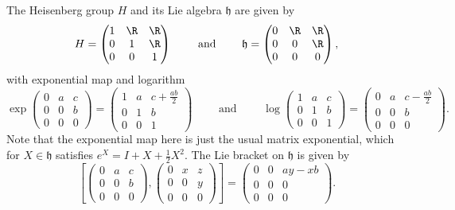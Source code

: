 \begin{example}
\label{ex:heisenberg_def}
The Heisenberg group $H$ and its Lie algebra $\mathfrak{h}$ are given by
\[
H=\left(\begin{matrix} 1 & \R & \R \\ 0 & 1 & \R \\ 0&0&1\end{matrix}\right) \qquad \text{ and } \qquad
\mathfrak{h}=\left(\begin{matrix} 0 & \R & \R \\ 0 & 0 & \R \\ 0&0&0\end{matrix}\right),
\]
with exponential map and logarithm
\[
\exp \left(\begin{matrix} 0 & a & c \\ 0 & 0 & b \\ 0&0&0\end{matrix}\right) = \left(\begin{matrix} 1 & a & c+\frac{ab}{2} \\ 0 & 1 & b \\ 0&0&1\end{matrix}\right) \qquad \text{ and } \qquad \log \left(\begin{matrix} 1 & a & c \\ 0 & 1 & b \\ 0&0&1\end{matrix}\right) = \left(\begin{matrix} 0 & a & c-\frac{ab}{2} \\ 0 & 0 & b \\ 0&0&0\end{matrix}\right).
\]
Note that the exponential map here is just the usual matrix exponential, which for $X\in \mathfrak{h}$ satisfies $e^X=I+X+\frac{1}{2}X^2$. The Lie bracket on $\mathfrak{h}$ is given by
\[
\left[\left(\begin{matrix} 0 & a & c \\ 0 & 0 & b \\ 0&0&0\end{matrix}\right),\left(\begin{matrix} 0 & x & z \\ 0 & 0 & y \\ 0&0&0\end{matrix}\right)\right] = \left(\begin{matrix} 0 & 0 & ay-xb \\ 0 & 0 & 0 \\ 0&0&0\end{matrix}\right).
\]
\end{example}
